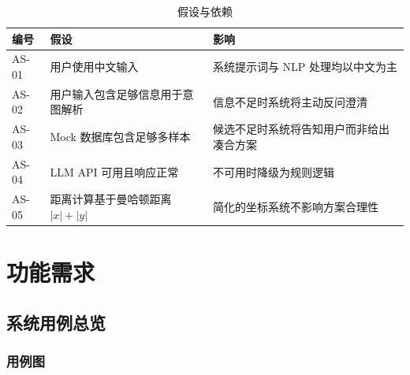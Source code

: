 \documentclass[12pt,a4paper]{ctexart}
\begin{document}
\begin{table}[ht]
\centering
\begin{tabular}{p{1.5cm}p{5.5cm}p{5.5cm}}
\toprule
\textbf{编号} & \textbf{假设} & \textbf{影响} \\
\midrule
AS-01 & 用户使用中文输入 & 系统提示词与 NLP 处理均以中文为主 \\
AS-02 & 用户输入包含足够信息用于意图解析 & 信息不足时系统将主动反问澄清 \\
AS-03 & Mock 数据库包含足够多样本 & 候选不足时系统将告知用户而非给出凑合方案 \\
AS-04 & LLM API 可用且响应正常 & 不可用时降级为规则逻辑 \\
AS-05 & 距离计算基于曼哈顿距离 $|x|+|y|$ & 简化的坐标系统不影响方案合理性 \\
\bottomrule
\end{tabular}
\caption{假设与依赖}
\label{tab:assumptions}
\end{table}

\newpage

\section{功能需求}

\subsection{系统用例总览}

\subsubsection{用例图}
\end{document}
